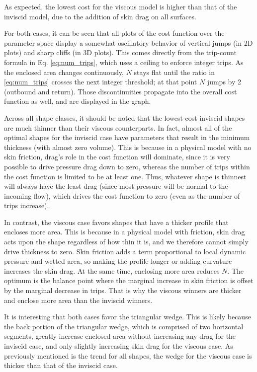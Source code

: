 \documentclass[11pt]{article}
\begin{document}
As expected, the lowest cost for the viscous model is higher than that of the inviscid model, due to the addition of skin drag on all surfaces.

For both cases, it can be seen that all plots of the cost function over the parameter space display a somewhat oscillatory behavior of vertical jumps (in 2D plots) and sharp cliffs (in 3D plots). This comes directly from the trip-count formula in Eq. \ref{eq:num_trips}, which uses a ceiling to enforce integer trips. As the enclosed area changes continuously, $N$ stays flat until the ratio in \ref{eq:num_trips} crosses the next integer threshold; at that point $N$ jumps by 2 (outbound and return). Those discontinuities propagate into the overall cost function as well, and are displayed in the graph.

Across all shape classes, it should be noted that the lowest-cost inviscid shapes are much thinner than their viscous counterparts. In fact, almost all of the optimal shapes for the inviscid case have parameters that result in the minimum thickness (with almost zero volume). This is because in a physical model with no skin friction, drag's role in the cost function will dominate, since it is very possible to drive pressure drag down to zero, whereas the number of trips within the cost function is limited to be at least one. Thus, whatever shape is thinnest will always have the least drag (since most pressure will be normal to the incoming flow), which drives the cost function to zero (even as the number of trips increase).

In contrast, the viscous case favors shapes that have a thicker profile that encloses more area. This is because in a physical model with friction, skin drag acts upon the shape regardless of how thin it is, and we therefore cannot simply drive thickness to zero. Skin friction adds a term proportional to local dynamic pressure and wetted area, so making the profile longer or adding curvature increases the skin drag. At the same time, enclosing more area reduces $N$. The optimum is the balance point where the marginal increase in skin friction is offset by the marginal decrease in trips. That is why the viscous winners are thicker and enclose more area than the inviscid winners.

It is interesting that both cases favor the triangular wedge. This is likely because the back portion of the triangular wedge, which is comprised of two horizontal segments, greatly increase enclosed area without increasing any drag for the inviscid case, and only slightly increasing skin drag for the viscous case. As previously mentioned is the trend for all shapes, the wedge for the viscous case is thicker than that of the inviscid case.
\end{document}
